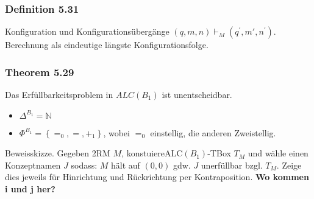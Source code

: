 \subsubsection{Definition 5.31}\label{definition-5.31}

Konfiguration und Konfigurationsübergänge
$\left( q,m,n \right) \vdash_{M}(q^{'},m',n^{'})$. Berechnung als
eindeutige längste Konfigurationsfolge.

\subsubsection{Theorem 5.29}\label{theorem-5.29}

Das Erfüllbarkeitsproblem in $ALC(B_{1})$ ist unentscheidbar.

\begin{itemize}
\item
  $\Delta^{B_{1}}\mathbb{= N}$
\item
  $\Phi^{B_{1}} = \left\{ =_{0}, = , +_{1} \right\}$, wobei $=_{0}$
  einstellig, die anderen Zweistellig.
\end{itemize}

Beweisskizze. Gegeben 2RM $M$,
konstuiere$\text{ALC}\left( B_{1} \right)$-TBox $T_{M}$ und wähle
einen Konzeptnamen $J$ sodass: $M$ hält auf $\left( 0,0 \right)$
gdw. $J$ unerfüllbar bzgl. $T_{M}$. Zeige dies jeweils für
Hinrichtung und Rückrichtung per Kontraposition. \textbf{Wo kommen i und
j her?}